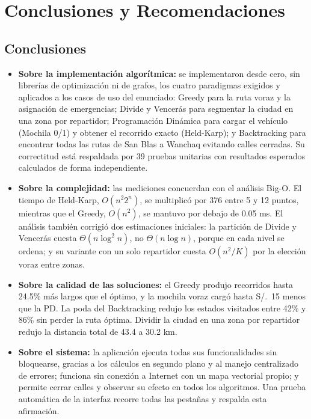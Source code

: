 \chapter{Conclusiones y Recomendaciones}

\section{Conclusiones}

\begin{itemize}
    \item \textbf{Sobre la implementación algorítmica:} se implementaron desde cero, sin librerías de optimización ni de grafos, los cuatro paradigmas exigidos y aplicados a los casos de uso del enunciado: Greedy para la ruta voraz y la asignación de emergencias; Divide y Vencerás para segmentar la ciudad en una zona por repartidor; Programación Dinámica para cargar el vehículo (Mochila 0/1) y obtener el recorrido exacto (Held-Karp); y Backtracking para encontrar todas las rutas de San Blas a Wanchaq evitando calles cerradas. Su correctitud está respaldada por 39 pruebas unitarias con resultados esperados calculados de forma independiente.

    \item \textbf{Sobre la complejidad:} las mediciones concuerdan con el análisis Big-O. El tiempo de Held-Karp, $O(n^2 2^n)$, se multiplicó por 376 entre 5 y 12 puntos, mientras que el Greedy, $O(n^2)$, se mantuvo por debajo de 0.05 ms. El análisis también corrigió dos estimaciones iniciales: la partición de Divide y Vencerás cuesta $\Theta(n\log^2 n)$, no $\Theta(n\log n)$, porque en cada nivel se ordena; y su variante con un solo repartidor cuesta $O(n^2/K)$ por la elección voraz entre zonas.

    \item \textbf{Sobre la calidad de las soluciones:} el Greedy produjo recorridos hasta 24.5\% más largos que el óptimo, y la mochila voraz cargó hasta S/.~15 menos que la PD. La poda del Backtracking redujo los estados visitados entre 42\% y 86\% sin perder la ruta óptima. Dividir la ciudad en una zona por repartidor redujo la distancia total de 43.4 a 30.2 km.

    \item \textbf{Sobre el sistema:} la aplicación ejecuta todas sus funcionalidades sin bloquearse, gracias a los cálculos en segundo plano y al manejo centralizado de errores; funciona sin conexión a Internet con un mapa vectorial propio; y permite cerrar calles y observar su efecto en todos los algoritmos. Una prueba automática de la interfaz recorre todas las pestañas y respalda esta afirmación.
\end{itemize}

